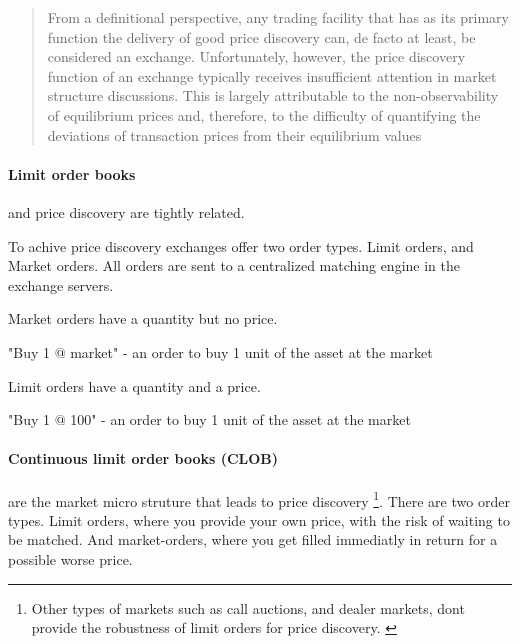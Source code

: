 \documentclass[12pt]{article}
\begin{document}
\begin{quote}
From a definitional perspective, any trading facility that has as its primary function the delivery of good price discovery can, de facto at least, be considered an exchange. Unfortunately, however, the price discovery function of an  exchange typically receives insufficient attention in market structure discussions. This is largely attributable to the non-observability of equilibrium prices and, therefore, to the difficulty of quantifying the deviations of transaction prices from their equilibrium values \cite{francioni_schwartz_2017}
\end{quote} 


\paragraph*{Limit order books} and price discovery are tightly related. \citep{RePEc:nbr:nberwo:6257} \cite{RePEc:eee:jfinec:v:17:y:1986:i:1:p:5-26}

To achive price discovery exchanges offer two order types. Limit orders, and Market orders. All orders are sent to a centralized matching engine in the exchange servers. 


Market orders have a quantity but no price. 

\begin{enumerate*}
    \item "Buy 1 @ market" - an order to buy 1 unit of the asset at the market  
\end{enumerate*}

Limit orders have a quantity and a price. 

\begin{enumerate*}
    \item "Buy 1 @ 100" - an order to buy 1 unit of the asset at the market  
\end{enumerate*}



\paragraph*{Continuous limit order books (CLOB)}   are the market micro struture that leads to price discovery \footnote{Other types of markets such as call auctions, and dealer markets, dont provide the robustness of limit orders for price discovery. \cite{RePEc:hal:journl:hal-00459785}}. There are two order types. Limit orders, where you provide your own price, with the risk of waiting to be matched. And market-orders, where you get filled immediatly in return for a possible worse price.
\end{document}

